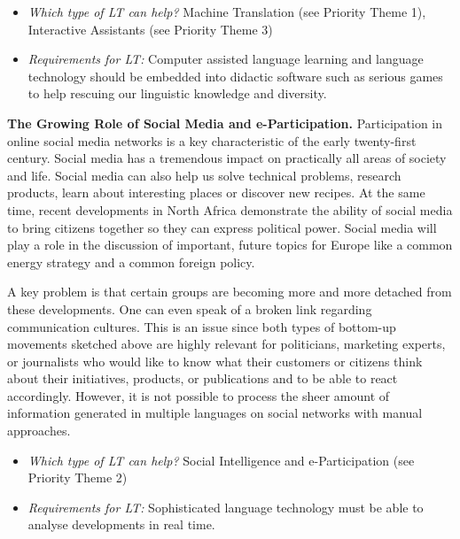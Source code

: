 \documentclass[10pt, plain]{../../metanetpaper}
\begin{document}
\begin{multicols}{2}
\begin{itemize}
\item \emph{Which type of LT can help?} Machine Translation (see Priority Theme 1), Interactive Assistants (see Priority Theme 3)
\item \emph{Requirements for LT:} Computer assisted language learning and language technology should be embedded into didactic software such as serious games to help rescuing our linguistic knowledge and diversity.
\end{itemize}

\textbf{The Growing Role of Social Media and e-Participation.} Participation in online social media networks is a key characteristic of the early twenty-first century. Social media has a tremendous impact on practically all areas of society and life. Social media can also help us solve technical problems, research products, learn about interesting places or discover new recipes. At the same time, recent developments in North Africa demonstrate the ability of social media to bring citizens together so they can express political power. Social media will play a role in the discussion of important, future topics for Europe like a common energy strategy and a common foreign policy.

A key problem is that certain groups are becoming more and more detached from these developments. One can even speak of a broken link regarding communication cultures. This is an issue since both types of bottom-up movements sketched above are highly relevant for politicians, marketing experts, or journalists who would like to know what their customers or citizens think about their initiatives, products, or publications and to be able to react accordingly. However, it is not possible to process the sheer amount of information generated in multiple languages on social networks with manual approaches. 

\begin{itemize}
\item \emph{Which type of LT can help?} Social Intelligence and e-Participation (see Priority Theme 2)
\item \emph{Requirements for LT:} Sophisticated language technology must be able to analyse developments in real time.
\end{itemize}


\end{multicols}
\end{document}

